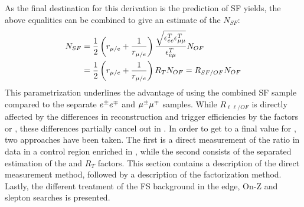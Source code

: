 As the final destination for this derivation is the prediction of SF yields, the above equalities can be combined to give an estimate of the $N_{SF}$:
\begin{align}
\label{eq:masterformulaExp}
    N_{SF} & = \frac{1}{2} \left( r_{\mu/e} + \frac{1}{r_{\mu/e}} \right) \frac{\sqrt{\epsilon^{T}_{ee}\epsilon^{T}_{\mu\mu}}}{\epsilon^{T}_{e\mu}} N_{OF}  \notag \\
           & = \frac{1}{2} \left( r_{\mu/e} + \frac{1}{r_{\mu/e}} \right) R_{T} N_{OF} = R_{SF/OF} N_{OF}
\end{align}                                                                                                                                                                  
This parametrization underlines the advantage of using the combined SF sample compared to the separate $e^{\pm}e^{\mp}$ and $\mu^{\pm}\mu^{\mp}$ samples.
While $R_{\ell\ell/OF}$ is directly affected by the differences in reconstruction and trigger efficiencies by the factors \rmue or \rmueinv, these differences partially cancel out in \Rsfof. 
In order to get to a final value for \Rsfof, two approaches have been taken. 
The first is a direct measurement of the ratio \Rsfof in data in a control region enriched in \ttbar, while the second consists of the separated estimation of the \rmue and $R_T$ factors.
This section contains a description of the direct measurement method, followed by a description of the factorization method. 
Lastly, the different treatment of the FS background in the edge, On-Z and slepton searches is presented.  
